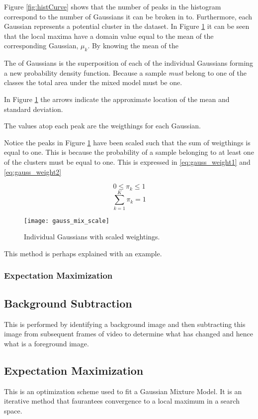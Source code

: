 Figure \ref{fig:histCurve} shows that the number of peaks in the histogram correspond to the number of Gaussians it can be broken in to. Furthermore, each Gaussian represents a potential cluster in the dataset. In Figure \ref{fig:histScale} it can be seen that the local maxima have a domain value equal to the mean of the corresponding Gaussian, $\mu_k$. By knowing the mean of the

The  of Gaussians is the superposition of each of the individual Gaussians forming a new probability density function. Because a sample \emph{must} belong to one of the classes the total area under the mixed model must be one. 

In Figure \ref{fig:histScale} the arrows indicate the approximate location of the mean and standard deviation. 

The values atop each peak are the weigthings for each Gaussian.


Notice the peaks in Figure \ref{fig:histScale} have been scaled such that the sum of weigthings is equal to one. This is because the probability of a sample belonging to at least one of the clusters must be equal to one. This is expressed in \ref{eq:gauss_weight1} and \ref{eq:gauss_weight2}

\begin{equation}
    0\leq \pi_k \leq 1
\label{eq:gauss_weight1}
\end{equation}
\begin{equation}
    \sum_{k=1}^{K}\pi_k = 1
\label{eq:gauss_weight2}
\end{equation}






\begin{figure}[H]
    \centering
    \centering\texttt{[image: gauss\_mix\_scale]}
    \caption{Individual Gaussians with scaled weightings.}
    \label{fig:histScale}
  \end{figure} 

This method is perhaps explained with an example. 




\subsubsection{Expectation Maximization}






\subsection{Background Subtraction}

This is performed by identifying a background image and then subtracting this image from subsequent frames of video to determine what has changed and hence what is a foreground image.

\subsection{Expectation Maximization}

This is an optimization scheme used to fit a Gaussian Mixture Model. It is an iterative method that faurantees convergence to a local maximum in a search space.